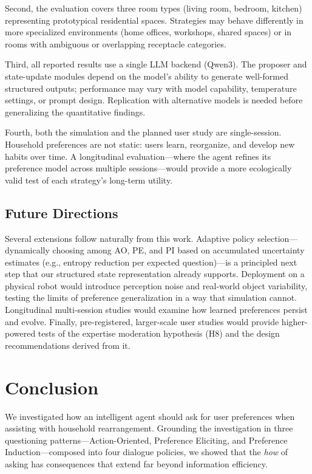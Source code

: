\documentclass[a4paper,fleqn]{cas-sc}
\begin{document}
Second, the evaluation covers three room types (living room, bedroom, kitchen) representing prototypical residential spaces. Strategies may behave differently in more specialized environments (home offices, workshops, shared spaces) or in rooms with ambiguous or overlapping receptacle categories.

Third, all reported results use a single LLM backend (Qwen3). The proposer and state-update modules depend on the model's ability to generate well-formed structured outputs; performance may vary with model capability, temperature settings, or prompt design. Replication with alternative models is needed before generalizing the quantitative findings.

Fourth, both the simulation and the planned user study are single-session. Household preferences are not static: users learn, reorganize, and develop new habits over time. A longitudinal evaluation---where the agent refines its preference model across multiple sessions---would provide a more ecologically valid test of each strategy's long-term utility.

\subsection{Future Directions}

Several extensions follow naturally from this work. Adaptive policy selection---dynamically choosing among AO, PE, and PI based on accumulated uncertainty estimates (e.g., entropy reduction per expected question)---is a principled next step that our structured state representation already supports. Deployment on a physical robot would introduce perception noise and real-world object variability, testing the limits of preference generalization in a way that simulation cannot. Longitudinal multi-session studies would examine how learned preferences persist and evolve. Finally, pre-registered, larger-scale user studies would provide higher-powered tests of the expertise moderation hypothesis (H8) and the design recommendations derived from it.


\section{Conclusion}\label{sec:conclusion}

We investigated how an intelligent agent should ask for user preferences when assisting with household rearrangement. Grounding the investigation in three questioning patterns---Action-Oriented, Preference Eliciting, and Preference Induction---composed into four dialogue policies, we showed that the \emph{how} of asking has consequences that extend far beyond information efficiency.
\end{document}
